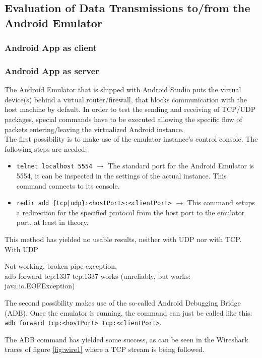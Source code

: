 \subsection{Evaluation of Data Transmissions to/from the Android Emulator}
\subsubsection{Android App as client}

\subsubsection{Android App as server}

The Android Emulator that is shipped with Android Studio puts the virtual device(s) behind a virtual router/firewall, that blocks communication with the host machine by default. In order to test the sending and receiving of TCP/UDP packages, special commands have to be executed allowing the specific flow of packets entering/leaving the virtualized Android instance.\\

The first possibility is to make use of the emulator instance's control console. The following steps are needed: 

\begin{itemize}
	\item \texttt{telnet localhost 5554} $\rightarrow$ The standard port for the Android Emulator is 5554, it can be inspected in the settings of the actual instance. This command connects to its console.
	\item \texttt{redir add \{tcp|udp\}:<hostPort>:<clientPort>} $\rightarrow$ This command setups a redirection for the specified protocol from the host port to the emulator port, at least in theory. 
\end{itemize}

This method has yielded no usable results, neither with UDP nor with TCP. With UDP 

Not working, broken pipe exception,\\
adb forward tcp:1337 tcp:1337 works (unreliably, but works:  java.io.EOFException)


The second possibility makes use of the so-called Android Debugging Bridge (ADB). Once the emulator is running, the command can just be called like this: \texttt{adb forward tcp:<hostPort> tcp:<clientPort>}.

The ADB command has yielded some success, as can be seen in the Wireshark traces of figure \ref{fig:wire1} where a TCP stream is being followed. 

